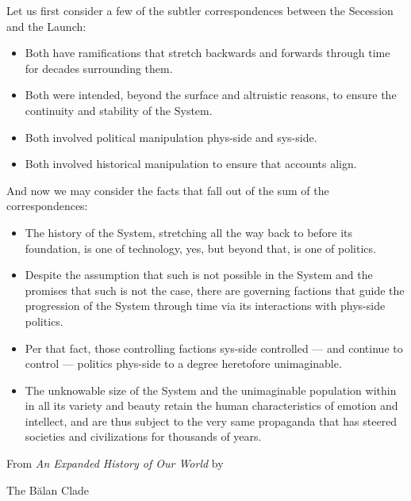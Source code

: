   Let us first consider a few of the subtler correspondences between the Secession and the Launch:
  
  \begin{itemize}
  \item Both have ramifications that stretch backwards and forwards through time for decades surrounding them.
  \item Both were intended, beyond the surface and altruistic reasons, to ensure the continuity and stability of the System.
  \item Both involved political manipulation phys-side and sys-side.
  \item Both involved historical manipulation to ensure that accounts align.
  \end{itemize}
 
  And now we may consider the facts that fall out of the sum of the correspondences:
 
  \begin{itemize}
  \item The history of the System, stretching all the way back to before its foundation, is one of technology, yes, but beyond that, is one of politics.
  \item Despite the assumption that such is not possible in the System and the promises that such is not the case, there are governing factions that guide the progression of the System through time via its interactions with phys-side politics.
  \item Per that fact, those controlling factions sys-side controlled --- and continue to control --- politics phys-side to a degree heretofore unimaginable.
  \item The unknowable size of the System and the unimaginable population within in all its variety and beauty retain the human characteristics of emotion and intellect, and are thus subject to the very same propaganda that has steered societies and civilizations for thousands of years.
  \end{itemize}

  \vspace{1em}

  From \emph{An Expanded History of Our World} by

  The Bălan Clade

  \vfill

